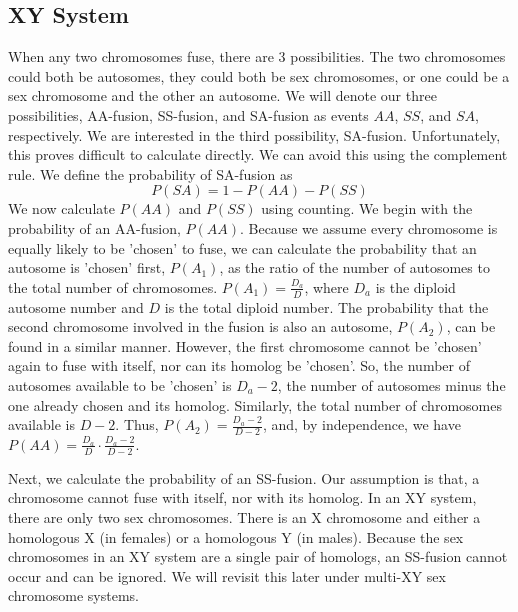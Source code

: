 \documentclass[12pt]{article}
\begin{document}
\subsection{XY System}
When any two chromosomes fuse, there are 3 possibilities. 
The two chromosomes could both be autosomes, they could both be sex chromosomes, or one could be a sex chromosome and the other an autosome. 
We will denote our three possibilities, AA-fusion, SS-fusion, and SA-fusion as events $AA$, $SS$, and $SA$, respectively. 
We are interested in the third possibility, SA-fusion. Unfortunately, this proves difficult to calculate directly. We can avoid this using the complement rule. 
We define the probability of SA-fusion as
\begin{equation} \label{eq1}
P(SA)=1-P(AA)-P(SS)
\end{equation}
We now calculate $P(AA)$ and $P(SS)$ using counting.
We begin with the probability of an AA-fusion, $P(AA)$.
Because we assume every chromosome is equally likely to be 'chosen' to fuse, we can calculate the probability that an autosome is 'chosen' first, $P(A_1)$, as the ratio of the number of autosomes to the total number of chromosomes. 
$P(A_1) = \frac{D_a}{D}$, where $D_a$ is the diploid autosome number and $D$ is the total diploid number.
The probability that the second chromosome involved in the fusion is also an autosome, $P(A_2)$, can be found in a similar manner.
However, the first chromosome cannot be 'chosen' again to fuse with itself, nor can its homolog be 'chosen'. 
So, the number of autosomes available to be 'chosen' is $D_a - 2$, the number of autosomes minus the one already chosen and its homolog.
Similarly, the total number of chromosomes available is $D - 2$. 
Thus, $P(A_2) = \frac{D_a - 2}{D - 2}$, and, by independence, we have $P(AA) = \frac{D_a}{D} \cdot \frac{D_a - 2}{D - 2}$.

Next, we calculate the probability of an SS-fusion. 
Our assumption is that, a chromosome cannot fuse with itself, nor with its homolog. 
In an XY system, there are only two sex chromosomes. 
There is an X chromosome and either a homologous X (in females) or a homologous Y (in males).
Because the sex chromosomes in an XY system are a single pair of homologs, an SS-fusion cannot occur and can be ignored. 
We will revisit this later under multi-XY sex chromosome systems.
\end{document}

